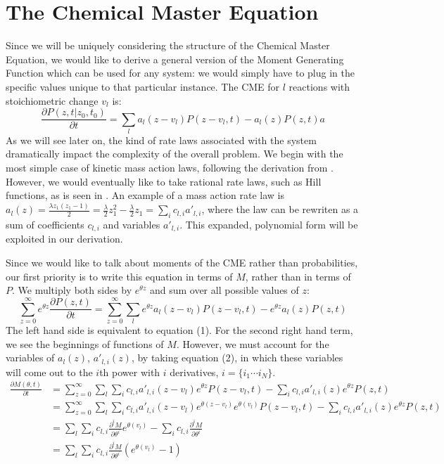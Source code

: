 \documentclass[a4paper,10pt]{article}
\begin{document}
\section{The Chemical Master Equation}
Since we will be uniquely considering the structure of the Chemical Master Equation, we would like to derive a general version of the Moment Generating Function which can be used for any system: we would simply have to plug in the specific values unique to that particular instance. The CME for $l$ reactions with stoichiometric change $v_l$ is:
$$\frac{\partial P(z,t|z_0,t_0)}{\partial t} = \sum_l a_l(z-v_l)P(z-v_l,t) - a_l(z)P(z,t)a$$
As we will see later on, the kind of rate laws associated with the system dramatically impact the complexity of the overall problem. We begin with the most simple case of kinetic mass action laws, following the derivation from \cite{1}. However, we would eventually like to take rational rate laws, such as Hill functions, as is seen in \cite{2}. An example of a mass action rate law is $a_l(z)= \frac{\lambda z_1(z_1-1)}{2}= \frac{\lambda}{2}z_1^2-\frac{\lambda}{2}z_1=\sum_i c_{l,i} a\prime_{l,i}$, where the law can be rewriten as a sum of coefficients $c_{l,i} $ and variables $a\prime_{l,i}$. This expanded, polynomial form will be exploited in our derivation.

Since we would like to talk about moments of the CME rather than probabilities, our first priority is to write this equation in terms of $M$, rather than in terms of $P$. We multiply both sides by $e^{\theta z}$ and sum over all possible values of $z$:
$$\sum_{z=0}^\infty e^{\theta z} \frac{\partial P(z,t)}{\partial t} = \sum_{z=0}^\infty \sum_l e^{\theta z} a_l(z-v_l)P(z-v_l,t) - e^{\theta z} a_l(z)P(z,t)$$
The left hand side is equivalent to equation (1). For the second right hand term, we see the beginnings of functions of $M$. However, we must account for the variables of $a_l(z)$, $a\prime_{l,i}(z)$, by taking equation (2), in which these variables will come out to the $i$th power with $i$ derivatives, $i=\{i_1\cdots i_N\}$.
\begin{align*}
 \frac{\partial M(\theta, t)}{\partial t} &= \sum_{z=0}^\infty \sum_l \sum_i c_{l,i} a\prime_{l,i}(z-v_l) e^{\theta z} P(z-v_l,t) - \sum_i c_{l,i} a\prime_{l,i}(z) e^{\theta z} P(z,t)  \\
 &= \sum_{z=0}^\infty \sum_l \sum_i c_{l,i} a\prime_{l,i}(z-v_l) e^{\theta (z-v_l)} e^{\theta (v_l)}P(z-v_l,t) - \sum_i c_{l,i} a\prime_{l,i}(z) e^{\theta z} P(z,t)  \\
  &=  \sum_l \sum_i c_{l,i} \frac{\partial ^i M}{\partial \theta^i} e^{\theta (v_l)} - \sum_i c_{l,i} \frac{\partial ^i M}{\partial \theta^i} \\
  &=  \sum_l \sum_i c_{l,i} \frac{\partial ^i M}{\partial \theta^i} \left(e^{\theta (v_l)}-1\right) 
\end{align*}
\end{document}
